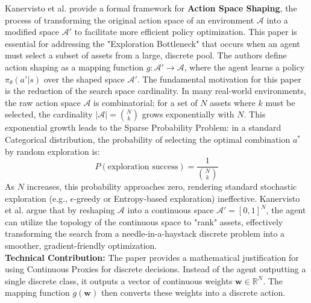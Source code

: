 \documentclass[a4paper]{scrartcl}
\begin{document}
Kanervisto et al. \cite{Kanervisto2020} provide a formal framework for \textbf{Action Space Shaping}, the process of transforming the original action space of an environment $\mathcal{A}$ into a modified space $\mathcal{A}'$ to facilitate more efficient policy optimization. This paper is essential for addressing the "Exploration Bottleneck" that occurs when an agent must select a subset of assets from a large, discrete pool.
The authors define action shaping as a mapping function $g: \mathcal{A}' \rightarrow \mathcal{A}$, where the agent learns a policy $\pi_{\theta}(a'|s)$ over the shaped space $\mathcal{A}'$. The fundamental motivation for this paper is the reduction of the search space cardinality. In many real-world environments, the raw action space $\mathcal{A}$ is combinatorial; for a set of $N$ assets where $k$ must be selected, the cardinality $| \mathcal{A} | = \binom{N}{k}$ grows exponentially with $N$. 
This exponential growth leads to the Sparse Probability Problem: in a standard Categorical distribution, the probability of selecting the optimal combination $a^*$ by random exploration is:
\begin{equation}
P(\text{exploration success}) = \frac{1}{\binom{N}{k}}
\end{equation}
As $N$ increases, this probability approaches zero, rendering standard stochastic exploration (e.g., $\epsilon$-greedy or Entropy-based exploration) ineffective. Kanervisto et al. argue that by reshaping $\mathcal{A}$ into a continuous space $\mathcal{A}' = [0, 1]^N$, the agent can utilize the topology of the continuous space to "rank" assets, effectively transforming the search from a needle-in-a-haystack discrete problem into a smoother, gradient-friendly optimization.
\\
\textbf{Technical Contribution:} 
The paper provides a mathematical justification for using Continuous Proxies for discrete decisions. Instead of the agent outputting a single discrete class, it outputs a vector of continuous weights $\mathbf{w} \in \mathbb{R}^N$. The mapping function $g(\mathbf{w})$ then converts these weights into a discrete action.
\end{document}
